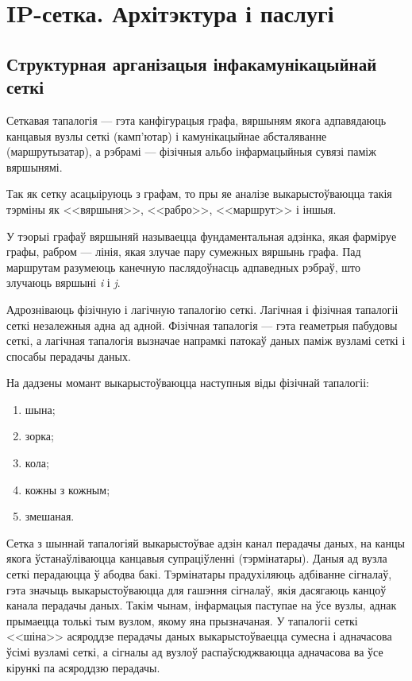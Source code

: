 \section{IP-сетка. Архітэктура і паслугі}

\subsection{Структурная арганізацыя інфакамунікацыйнай сеткі}

Сеткавая тапалогія --- гэта канфігурацыя графа, вяршыням якога
адпавядаюць канцавыя вузлы сеткі (камп'ютар) і камунікацыйнае
абсталяванне (маршрутызатар), а рэбрамі --- фізічныя альбо
інфармацыйныя сувязі паміж вяршынямі.

Так як сетку асацыіруюць з графам, то пры яе аналізе выкарыстоўваюцца
такія тэрміны як <<вяршыня>>, <<рабро>>, <<маршрут>> і іншыя.

У тэорыі графаў вяршыняй называецца фундаментальная адзінка, якая
фарміруе графы, рабром --- лінія, якая злучае пару сумежных
вяршынь графа. Пад маршрутам разумеюць канечную паслядоўнасць адпаведных рэбраў, што злучаюць вяршыні \textit{i} і \textit{j}.

Адрозніваюць фізічную і лагічную тапалогію сеткі.
Лагічная і фізічная тапалогіі сеткі незалежныя адна ад адной.
Фізічная тапалогія --- гэта геаметрыя пабудовы сеткі, а лагічная тапалогія
вызначае напрамкі патокаў даных паміж вузламі сеткі і спосабы
перадачы даных.

На дадзены момант выкарыстоўваюцца наступныя віды фізічнай тапалогіі:
\begin{enumerate}
    \item шына;
    \item зорка;
    \item кола;
    \item кожны з кожным;
    \item змешаная.
\end{enumerate}

Сетка з шыннай тапалогіяй выкарыстоўвае адзін канал перадачы даных,
на канцы якога ўстанаўліваюцца канцавыя супраціўленні (тэрмінатары).
Даныя ад вузла сеткі перадаюцца ў абодва бакі. Тэрмінатары прадухіляюць
адбіванне сігналаў, гэта значыць выкарыстоўваюцца для гашэння сігналаў,
якія дасягаюць канцоў канала перадачы даных.
Такім чынам, інфармацыя паступае на ўсе вузлы, аднак прымаецца толькі
тым вузлом, якому яна прызначаная. У тапалогіі сеткі <<шіна>> асяроддзе
перадачы даных выкарыстоўваецца сумесна і адначасова ўсімі вузламі сеткі,
а сігналы ад вузлоў распаўсюджваюцца адначасова ва ўсе кірункі па
асяроддзю перадачы.

